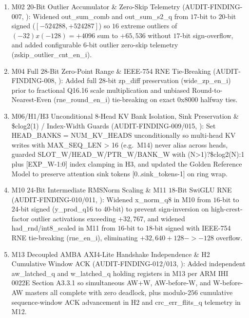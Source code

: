 \documentclass[10pt,journal,compsoc]{IEEEtran}
\def\texttt#1{#1}%
\def\textbf#1{#1}%
\def\to{->}%
\def\times{x}%
\begin{document}
\begin{enumerate}
    \item \textbf{\texttt{M02} $20$-Bit Outlier Accumulator \& Zero-Skip Telemetry (\texttt{AUDIT-FINDING-007}, \cite{parhami2010computer,avizienis1961signed})}: Widened \texttt{out\_sum\_comb} and \texttt{out\_sum\_s2\_q} from $17$-bit to $20$-bit signed ($[-524288,+524287]$) so $16$ extreme outliers of $(-32)\times(-128)=+4096$ sum to $+65,536$ without $17$-bit sign-overflow, and added configurable $6$-bit outlier zero-skip telemetry (\texttt{zskip\_outlier\_cnt\_en\_i}).
    \item \textbf{\texttt{M04} Full $28$-Bit Zero-Point Range \& IEEE-754 RNE Tie-Breaking (\texttt{AUDIT-FINDING-008}, \cite{ieee2019fp754,nagel2021white})}: Added full $28$-bit \texttt{zp\_diff} preservation (\texttt{wide\_zp\_en\_i}) prior to fractional Q16.16 scale multiplication and unbiased Round-to-Nearest-Even (\texttt{rne\_round\_en\_i}) tie-breaking on exact \texttt{0x8000} halfway ties.
    \item \textbf{\texttt{M06/H1/H3} Unconditional $8$-Head KV Bank Isolation, Sink Preservation \& \texttt{\$clog2(1)} / Index-Width Guards (\texttt{AUDIT-FINDING-009/015}, \cite{xiao2024streamingllm})}: Set \texttt{HEAD\_BANKS = NUM\_KV\_HEADS} unconditionally so multi-head KV writes with \texttt{MAX\_SEQ\_LEN > 16} (e.g.\ \texttt{M14}) never alias across heads, guarded \texttt{SLOT\_W}/\texttt{HEAD\_W}/\texttt{PTR\_W}/\texttt{BANK\_W} with \texttt{(N>1)?\$clog2(N):1} plus \texttt{[EXP\_W-1:0]} index clamping in \texttt{H3}, and updated the Golden Reference Model to preserve attention sink tokens \texttt{[0..sink\_tokens-1]} on ring wrap.
    \item \textbf{\texttt{M10} $24$-Bit Intermediate RMSNorm Scaling \& \texttt{M11} $18$-Bit SwiGLU RNE (\texttt{AUDIT-FINDING-010/011}, \cite{zhang2019rmsnorm,shazeer2020glu})}: Widened \texttt{x\_norm\_q8} in \texttt{M10} from $16$-bit to $24$-bit signed (\texttt{y\_prod\_q16} to $40$-bit) to prevent sign-inversion on high-crest-factor outlier activations exceeding $+32,767$, and widened \texttt{had\_rnd}/\texttt{int8\_scaled} in \texttt{M11} from $16$-bit to $18$-bit signed with IEEE-754 RNE tie-breaking (\texttt{rne\_en\_i}), eliminating $+32,640 + 128 \to -128$ overflow.
    \item \textbf{\texttt{M13} Decoupled AMBA AXI4-Lite Handshake Independence \& \texttt{H2} Cumulative Window ACK (\texttt{AUDIT-FINDING-012/013}, \cite{arm2013axi,ucie2024spec})}: Added independent \texttt{aw\_latched\_q} and \texttt{w\_latched\_q} holding registers in \texttt{M13} per ARM IHI 0022E Section A3.3.1 so simultaneous \texttt{AW+W}, \texttt{AW}-before-\texttt{W}, and \texttt{W}-before-\texttt{AW} masters all complete with zero deadlock, plus modulo-$256$ cumulative sequence-window ACK advancement in \texttt{H2} and \texttt{crc\_err\_flits\_q} telemetry in \texttt{M12}.

\end{enumerate}
\end{document}
